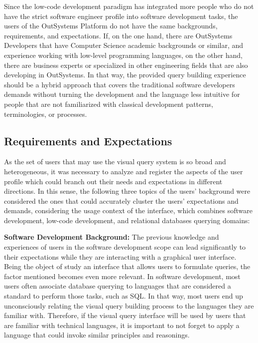 Since the low-code development paradigm has integrated more people who do not have the strict software engineer profile into software development tasks, the users of the OutSystems Platform do not have the same backgrounds, requirements, and expectations. If, on the one hand, there are OutSystems Developers that have Computer Science academic backgrounds or similar, and experience working with low-level programming languages, on the other hand, there are business experts or specialized in other engineering fields that are also developing in OutSystems. In that way, the provided query building experience should be a hybrid approach that covers the traditional software developers demands without turning the development and the language less intuitive for people that are not familiarized with classical development patterns, terminologies, or processes.

\subsection{Requirements and Expectations}
\label{subsec:requirements_and_expectations}

As the set of users that may use the visual query system is so broad and heterogeneous, it was necessary to analyze and register the aspects of the user profile which could branch out their needs and expectations in different directions. In this sense, the following three topics of the users' background were considered the ones that could accurately cluster the users' expectations and demands, considering the usage context of the interface, which combines software development, low-code development, and relational databases querying domains:

\medskip

\textbf{Software Development Background:} The previous knowledge and experiences of users in the software development scope can lead significantly to their expectations while they are interacting with a graphical user interface. Being the object of study an interface that allows users to formulate queries, the factor mentioned becomes even more relevant. In software development, most users often associate database querying to languages that are considered a standard to perform those tasks, such as SQL. In that way, most users end up unconsciously relating the visual query building process to the languages they are familiar with. Therefore, if the visual query interface will be used by users that are familiar with technical languages, it is important to not forget to apply a language that could invoke similar principles and reasonings.

